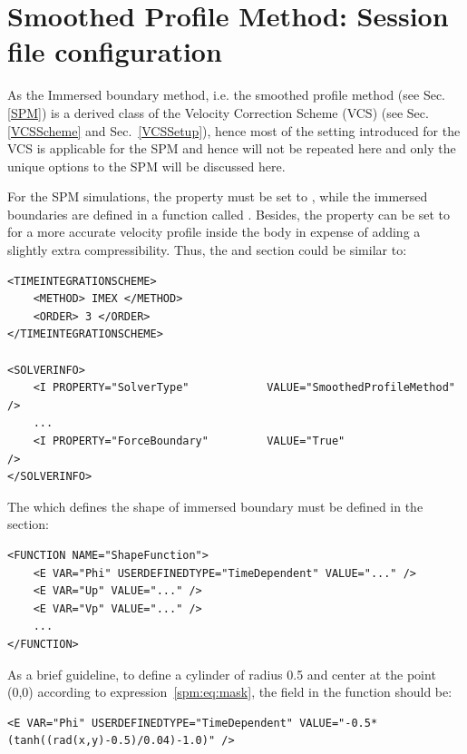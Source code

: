 \section{Smoothed Profile Method: Session file configuration}
As the Immersed boundary method, i.e. the smoothed profile method (see Sec.~
\ref{SPM}) is a derived class of the Velocity Correction Scheme (VCS) (see Sec.~
\ref{VCSScheme} and Sec.~\ref{VCSSetup}), hence most of the setting introduced 
for the VCS is applicable for the SPM and hence will not be repeated here and
only the unique options to the SPM will be discussed here.

For the SPM simulations, the property 
must be set to , while the immersed boundaries are
defined in a function called . Besides, the property
 can be set to  for a more accurate velocity 
profile inside the body in expense of adding a slightly extra compressibility.
Thus,
the 
and  section could be similar to:

\begin{lstlisting}[style=XMLStyle]
<TIMEINTEGRATIONSCHEME>
    <METHOD> IMEX </METHOD>
    <ORDER> 3 </ORDER>
</TIMEINTEGRATIONSCHEME>

<SOLVERINFO>
    <I PROPERTY="SolverType"            VALUE="SmoothedProfileMethod" />
    ...
    <I PROPERTY="ForceBoundary"         VALUE="True"                  />
</SOLVERINFO>
\end{lstlisting}

The  which defines the shape of immersed boundary must be
defined in the  section:

\begin{lstlisting}[style=XMLStyle]
<FUNCTION NAME="ShapeFunction">
    <E VAR="Phi" USERDEFINEDTYPE="TimeDependent" VALUE="..." />
    <E VAR="Up" VALUE="..." />
    <E VAR="Vp" VALUE="..." />
    ...
</FUNCTION>
\end{lstlisting}

As a brief guideline, to define a cylinder of radius 0.5 and center at the point
(0,0) according to expression~\eqref{spm:eq:mask}, the  field in
the  function should be:

\begin{lstlisting}[style=XMLStyle]
    <E VAR="Phi" USERDEFINEDTYPE="TimeDependent" VALUE="-0.5*(tanh((rad(x,y)-0.5)/0.04)-1.0)" />
\end{lstlisting}

